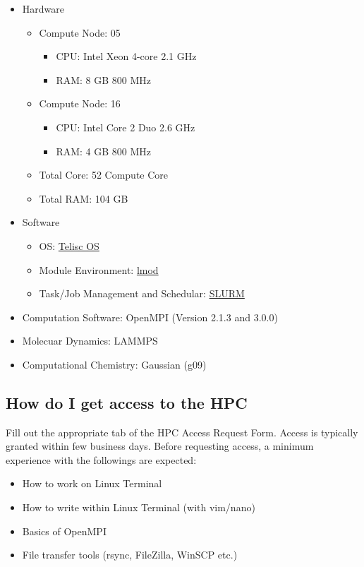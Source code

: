 \documentclass[11pt]{article}
\numberwithin{figure}{section}
\begin{document}
\begin{itemize}
    \item Hardware
        \begin{itemize}
            \item Compute Node: 05
                \begin{itemize}
                    \item CPU: Intel Xeon 4-core 2.1 GHz
                    \item RAM: 8 GB 800 MHz
                \end{itemize}
            \item Compute Node: 16
                \begin{itemize}
                    \item CPU: Intel Core 2 Duo 2.6 GHz
                    \item RAM: 4 GB 800 MHz
                \end{itemize}
            \item Total Core: 52 Compute Core
            \item Total RAM: 104 GB
        \end{itemize}
    \item Software
        \begin{itemize}
            \item OS: \href{https://www.teliscos.org}{Telisc OS}
            \item Module Environment: \href{https://lmod.readthedocs.io/en/latest/} {lmod}
            \item Task/Job Management and Schedular: \href{https://slurm.schedmd.com} {SLURM}
        \end{itemize}
    \item Computation Software: OpenMPI (Version 2.1.3 and 3.0.0)
    \item Molecuar Dynamics: LAMMPS
    \item Computational Chemistry: Gaussian (g09)
\end{itemize}

\subsection{How do I get access to the HPC}
Fill out the appropriate tab of the HPC Access Request Form. Access is
typically granted within few business days. Before requesting access, a minimum experience with the followings are expected:

\begin{itemize}
    \item How to work on Linux Terminal
    \item How to write within Linux Terminal (with vim/nano)
    \item Basics of OpenMPI
    \item File transfer tools (rsync, FileZilla, WinSCP etc.)
\end{itemize}
\end{document}
